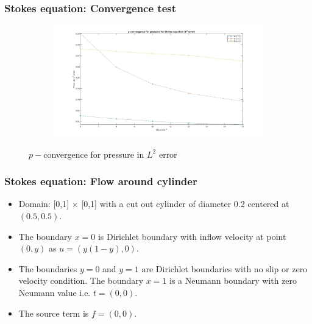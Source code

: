 \documentclass{beamer}
\begin{document}
\begin{frame}
\frametitle{Stokes equation: Convergence test}
\begin{figure}
\begin{subfigure}{0.9\textwidth}
\centering
  \includegraphics[width=0.9\linewidth]{p_conv_pressure_l2_stokes.jpg}
  \label{p_convergence_pressure_l2}
\end{subfigure}
\caption{$p-$convergence for pressure in $L^2$ error}
\label{p_conv_stokes_flow}
\end{figure}
\end{frame}
\begin{frame}
\frametitle{Stokes equation: Flow around cylinder}
\begin{itemize}
\item Domain: [0,1] $\times$ [0,1] with a cut out cylinder of diameter 0.2 centered at $(0.5,0.5)$.
\item The boundary ${x=0}$ is Dirichlet boundary with inflow velocity at point $(0,y)$ as $u = (y(1-y), 0)$. 
\item The boundaries ${y = 0}$ and ${y = 1}$ are Dirichlet boundaries with no slip or zero velocity condition. The boundary ${x = 1}$ is a Neumann boundary with zero Neumann value i.e. $t = (0, 0)$. 
\item The source term is $f = (0, 0)$.
\end{itemize}
\end{frame}
\end{document}
